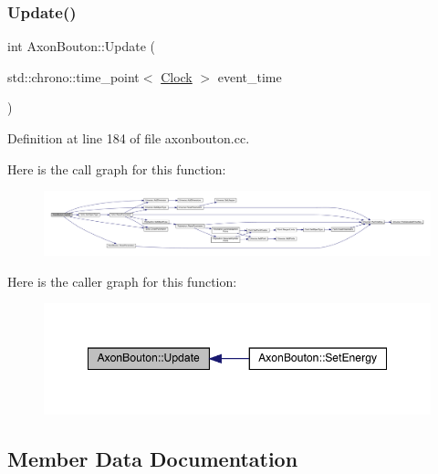 \subsubsection{\texorpdfstring{Update()}{Update()}}
{\footnotesize\ttfamily int Axon\+Bouton\+::\+Update (\begin{DoxyParamCaption}\item[{std\+::chrono\+::time\+\_\+point$<$ \hyperlink{universe_8h_a0ef8d951d1ca5ab3cfaf7ab4c7a6fd80}{Clock} $>$}]{event\+\_\+time }\end{DoxyParamCaption})}



Definition at line 184 of file axonbouton.\+cc.

Here is the call graph for this function\+:
\nopagebreak
\begin{figure}[H]
\begin{center}
\leavevmode
\includegraphics[width=350pt]{class_axon_bouton_a26f89bac681b8f0894fe1ae249733917_cgraph}
\end{center}
\end{figure}
Here is the caller graph for this function\+:
\nopagebreak
\begin{figure}[H]
\begin{center}
\leavevmode
\includegraphics[width=348pt]{class_axon_bouton_a26f89bac681b8f0894fe1ae249733917_icgraph}
\end{center}
\end{figure}


\subsection{Member Data Documentation}
\mbox{\label{class_axon_bouton_ad5b4e9b5fefb2ad9e6dfe5ad91be2dd7}} 
